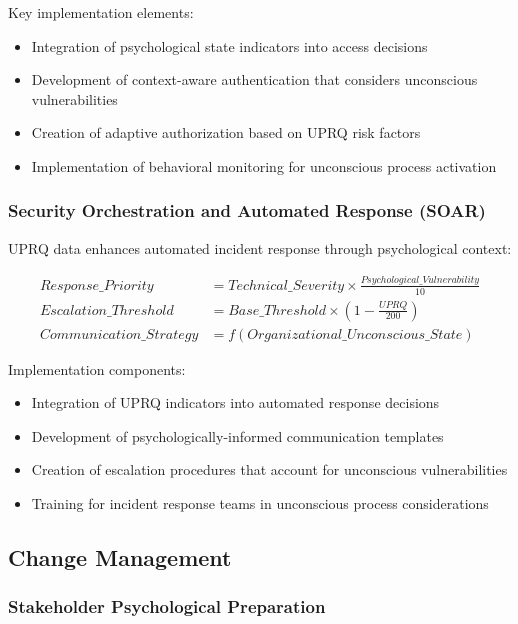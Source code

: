 \documentclass[11pt,a4paper]{article}
\begin{document}
Key implementation elements:
\begin{itemize}
\item Integration of psychological state indicators into access decisions
\item Development of context-aware authentication that considers unconscious vulnerabilities
\item Creation of adaptive authorization based on UPRQ risk factors
\item Implementation of behavioral monitoring for unconscious process activation
\end{itemize}

\subsubsection{Security Orchestration and Automated Response (SOAR)}

UPRQ data enhances automated incident response through psychological context:

\begin{align}
Response\_Priority &= Technical\_Severity \times \frac{Psychological\_Vulnerability}{10} \\
Escalation\_Threshold &= Base\_Threshold \times (1 - \frac{UPRQ}{200}) \\
Communication\_Strategy &= f(Organizational\_Unconscious\_State)
\end{align}

Implementation components:
\begin{itemize}
\item Integration of UPRQ indicators into automated response decisions
\item Development of psychologically-informed communication templates
\item Creation of escalation procedures that account for unconscious vulnerabilities
\item Training for incident response teams in unconscious process considerations
\end{itemize}

\subsection{Change Management}

\subsubsection{Stakeholder Psychological Preparation}
\end{document}
